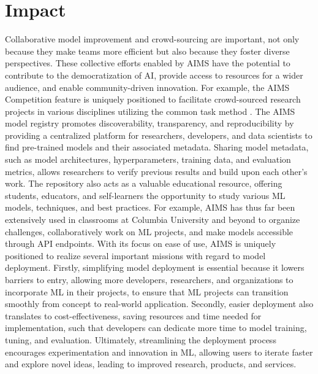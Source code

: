 \section{Impact}
Collaborative model improvement and crowd-sourcing are important, not only because they make teams more efficient but also because they foster diverse perspectives. These collective efforts enabled by AIMS have the potential to contribute to the democratization of AI, provide access to resources for a wider audience, and enable community-driven innovation. For example, the AIMS Competition feature is uniquely positioned to facilitate crowd-sourced research projects in various disciplines utilizing the common task method \citep{salganik_measuring_2020}. 
The AIMS model registry promotes discoverability, transparency, and reproducibility by providing a centralized platform for researchers, developers, and data scientists to find pre-trained models and their associated metadata. Sharing model metadata, such as model architectures, hyperparameters, training data, and evaluation metrics, allows researchers to verify previous results and build upon each other's work. The repository also acts as a valuable educational resource, offering students, educators, and self-learners the opportunity to study various ML models, techniques, and best practices. For example, AIMS has thus far been extensively used in classrooms at Columbia University and beyond to organize challenges, collaboratively work on ML projects, and make models accessible through API endpoints. 
With its focus on ease of use, AIMS is uniquely positioned to realize several important missions with regard to model deployment. Firstly, simplifying model deployment is essential because it lowers barriers to entry, allowing more developers, researchers, and organizations to incorporate ML in their projects, to ensure that ML projects can transition smoothly from concept to real-world application. Secondly, easier deployment also translates to cost-effectiveness, saving resources and time needed for implementation, such that developers can dedicate more time to model training, tuning, and evaluation. Ultimately, streamlining the deployment process encourages experimentation and innovation in ML, allowing users to iterate faster and explore novel ideas, leading to improved research, products, and services.


